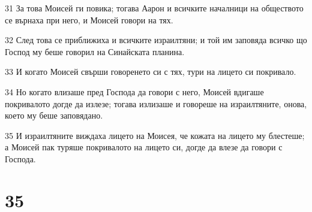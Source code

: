 \par 31 За това Моисей ги повика; тогава Аарон и всичките началници на обществото се върнаха при него, и Моисей говори на тях.
\par 32 След това се приближиха и всичките израилтяни; и той им заповяда всичко що Господ му беше говорил на Синайската планина.
\par 33 И когато Моисей свърши говоренето си с тях, тури на лицето си покривало.
\par 34 Но когато влизаше пред Господа да говори с него, Моисей вдигаше покривалото догде да излезе; тогава излизаше и говореше на израилтяните, онова, което му беше заповядано.
\par 35 И израилтяните виждаха лицето на Моисея, че кожата на лицето му блестеше; а Моисей пак туряше покривалото на лицето си, догде да влезе да говори с Господа.

\chapter{35}

